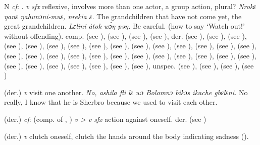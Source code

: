 \begin{letter}{N}
 \textit{cf}: . \textit{v} \textit{sfx} reflexive, involves more than one actor, a group action, plural? \textit{Nrokɛ ŋanɛ ŋahunɔni-muɛ, nrekia ɛ.} The grandchildren that have not come yet, the great grandchildren. \textit{Lɛlini àtok wɔ́ŋ pəŋ.} Be careful. (how to say ‘Watch out!' without offending). comp.  (see ),  (see ),  (see ),  (see ), der.  (see ),  (see ),  (see ),  (see ),  (see ),  (see ),  (see ),  (see ),  (see ),  (see ),  (see ),  (see ),  (see ),  (see ),  (see ),  (see ),  (see ),  (see ),  (see ),  (see ),  (see ),  (see ),  (see ),  (see ),  (see ),  (see ), 
 (see ),  (see ),  (see ),  (see ),  (see ),  (see ),  (see ),  (see ), unspec.  (see ),  (see ),  (see ),  (see ) 

 (der.) \textit{v} visit one another. \textit{No, ashila fli lɛ wɔ Bolomnɔ bikɔs ikache gbɛlɛni.} No really, I know that he is Sherbro because we used to visit each other.

 (der.) \textit{cf}:  (comp. of , ) \textit{v > v} \textit{sfx} action against oneself. der.  (see )

 (der.) \textit{v} clutch oneself, clutch the hands around the body indicating sadness (\citealt{Pichl1967}). 


\end{letter}
